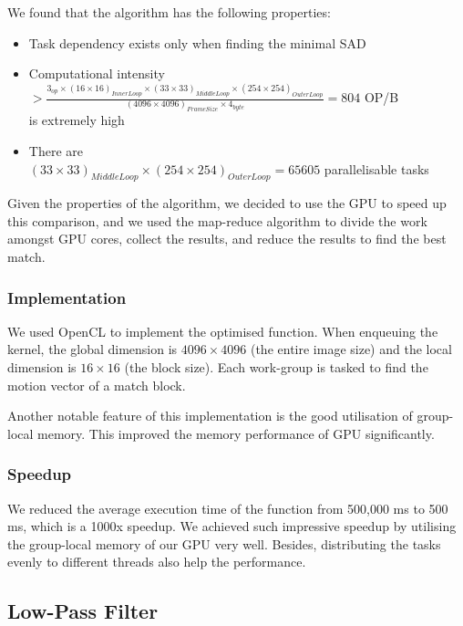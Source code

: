 \documentclass[a4paper]{article}
\begin{document}
We found that the algorithm has the following properties:
\begin{itemize}
\item Task dependency exists only when finding the minimal SAD
\item Computational intensity \\
  \(> \frac{3_{op} \times (16 \times 16)_{InnerLoop} \times (33 \times 33)_{MiddleLoop} \times
    (254 \times 254)_{OuterLoop}}{(4096 \times 4096)_{FrameSize} \times 4_{byte}} =
  804\) OP/B \\
  is extremely high
\item There are \\
  \((33 \times 33)_{MiddleLoop} \times (254 \times 254)_{OuterLoop} = 65605\)
  parallelisable tasks
\end{itemize}

Given the properties of the algorithm, we decided to use the GPU to
speed up this comparison, and we used the map-reduce algorithm to
divide the work amongst GPU cores, collect the results, and reduce the
results to find the best match.

\subsubsection{Implementation}
We used OpenCL to implement the optimised function. When enqueuing the
kernel, the global dimension is \(4096 \times 4096\) (the entire image
size) and the local dimension is \(16 \times 16\) (the block size). Each
work-group is tasked to find the motion vector of a match block.

Another notable feature of this implementation is the good utilisation
of group-local memory. This improved the memory performance of GPU
significantly.



\subsubsection{Speedup}
We reduced the average execution time of the function from 500,000 ms
to 500 ms, which is a 1000x speedup. We achieved such impressive
speedup by utilising the group-local memory of our GPU very well.
Besides, distributing the tasks evenly to different threads also help
the performance.

\subsection{Low-Pass Filter}
\end{document}
